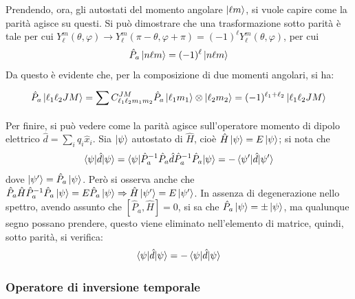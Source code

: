 \documentclass[11pt, a4paper]{scrartcl} %
\numberwithin{equation}{subsection}
\theoremstyle{style2}
\theoremstyle{style1}
\begin{document}
Prendendo, ora, gli autostati del momento angolare $\ket{\ell m} $, si vuole capire come la parit\`a agisce su questi.
Si pu\`o dimostrare che una trasformazione sotto parit\`a \`e tale per cui $Y_{\ell } ^m (\theta , \varphi ) \to Y_\ell ^m (\pi - \theta , \varphi + \pi) = (-1)^\ell Y_\ell ^m (\theta ,\varphi )$, per cui
\[
\hat{P}_a \ket{n\ell m} = (-1)^\ell \ket{n\ell m} 
\] 
Da questo \`e evidente che, per la composizione di due momenti angolari, si ha:
\[
\hat{P}_a \ket{\ell _1 \ell _2 JM} = \sum_{}^{} C^{JM} _{\ell _1\ell _2 m_1m_2} \hat{P}_a\ket{\ell _1 m_1} \otimes \ket{\ell _2 m_2} = (-1)^{\ell _1 + \ell _2} \ket{\ell _1 \ell _2 JM} 
\] 
Per finire, si pu\`o vedere come la parit\`a agisce sull'operatore momento di dipolo elettrico $\hat{d}= \sum_{i}^{} q_i \hat{x}_i$.
Sia $\ket{\psi } $ autostato di $\hat{H}$, cio\`e $\hat{H} \ket{\psi } = E \ket{\psi } $; si nota che
\[
\braket{\psi |\hat{d}|\psi } = \braket{\psi |\hat{P}_a^{-1} \hat{P}_a \hat{d}\hat{P}_{a} ^{-1} \hat{P}_a|\psi } = - \braket{\psi '|\hat{d}|\psi '} 
\] 
dove $\ket{\psi '} = \hat{P}_a \ket{\psi } $.
Per\`o si osserva anche che $\hat{P}_a \hat{H} \hat{P}_a^{-1} \hat{P}_a \ket{\psi } = E \hat{P}_a \ket{\psi } \Rightarrow \hat{H}\ket{\psi '} = E \ket{\psi '} $. 
In assenza di degenerazione nello spettro, avendo assunto che $[\hat{P}_a, \hat{H}] = 0$, si sa che $\hat{P}_a \ket{\psi }  = \pm \ket{\psi } $, ma qualunque segno possano prendere, questo viene eliminato nell'elemento di matrice, quindi, sotto parit\`a, si verifica:
\[
\braket{\psi |\hat{d}|\psi } = - \braket{\psi |\hat{d}|\psi } 
\] 
\subsubsection{Operatore di inversione temporale}
\end{document}
